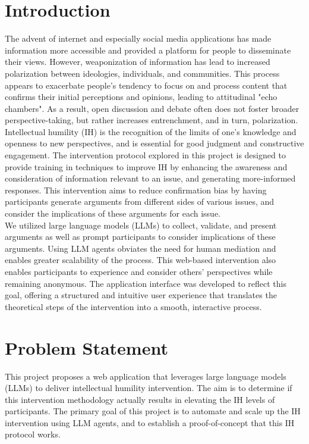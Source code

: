 \documentclass{scrartcl}
\begin{document}
\section{Introduction}
\label{section:introduction}

The advent of internet and especially social media applications has made information more accessible and provided a platform for people to disseminate their views. However, weaponization of information has lead to increased polarization between ideologies, individuals, and communities. This process appears to exacerbate people's tendency to focus on and process content that confirms their initial perceptions and opinions, leading to attitudinal "echo chambers". As a result, open discussion and debate often does not foster broader perspective-taking, but rather increases entrenchment, and in turn, polarization.\\
Intellectual humility (IH) is the recognition of the limits of one's knowledge and openness to new perspectives, and is essential for good judgment and constructive engagement. The intervention protocol explored in this project is designed to provide training in techniques to improve IH by enhancing the awareness and consideration of information relevant to an issue, and generating more-informed responses. This intervention aims to reduce confirmation bias by having participants generate arguments from different sides of various issues, and consider the implications of these arguments for each issue.\\
We utilized large language models (LLMs) to collect, validate, and present arguments as well as prompt participants to consider implications of these arguments. Using LLM agents obviates the need for human mediation and enables greater scalability of the process. This web-based intervention also enables participants to experience and consider others' perspectives while remaining anonymous. The application interface was developed to reflect this goal, offering a structured and intuitive user experience that translates the theoretical steps of the intervention into a smooth, interactive process.

\section{Problem Statement}
\label{section:problem-statement}
This project proposes a web application that leverages large language models (LLMs) to deliver intellectual humility intervention. The aim is to determine if this intervention methodology actually results in elevating the IH levels of participants. The primary goal of this project is to automate and scale up the IH intervention using LLM agents, and to establish a proof-of-concept that this IH protocol works.
\end{document}
